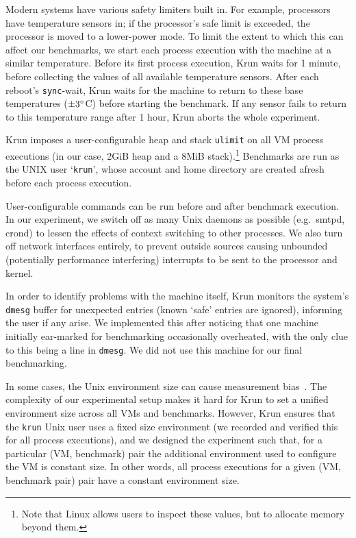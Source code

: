 \documentclass[preprint,numbers,10pt]{sigplanconf}
\newcommand{\krun}{Krun\xspace}
\begin{document}
Modern systems have various safety limiters built in. For example,
processors have temperature sensors in; if the processor's safe limit
is exceeded, the processor is moved to a lower-power mode. To limit the extent to which this can
affect our benchmarks, we start each process execution with the machine at a similar temperature.
Before its first process execution, \krun waits for 1 minute, before collecting
the values of all available temperature sensors. After each reboot's \texttt{sync}-wait, \krun waits
for the machine to return to these base temperatures ($\pm3\degree$C) before
starting the benchmark. If any sensor fails to return to this temperature range
after 1 hour, \krun aborts the whole experiment.

\krun imposes a
user-configurable heap and stack \texttt{ulimit} on all VM process executions
(in our case, 2GiB heap and a 8MiB stack).\footnote{Note that Linux allows users
to inspect these values, but to allocate memory beyond them.} Benchmarks are run
as the UNIX user `\texttt{krun}', whose account and home directory are created
afresh before each process execution.

User-configurable commands can be run before and after benchmark execution. In
our experiment, we switch off as many Unix daemons as possible (e.g.~smtpd,
crond) to lessen the effects of context switching to other processes. We also
turn off network interfaces entirely, to prevent outside sources causing unbounded
(potentially performance interfering) interrupts to be sent to the processor and kernel.

In order to identify problems with the machine itself, \krun monitors the
system's \texttt{dmesg} buffer for unexpected entries (known `safe' entries
are ignored), informing the user if any arise. We implemented this after
noticing that one machine initially ear-marked for benchmarking occasionally
overheated, with the only clue to this being a line in \texttt{dmesg}.
We did not use this machine for our final benchmarking.

In some cases, the Unix environment size can cause measurement
bias~\cite{mytkowicz09surprising}. The complexity of our experimental
setup makes it hard for \krun to set a unified environment size across all VMs and
benchmarks. However, \krun ensures that the \texttt{krun} Unix user uses
a fixed size environment (we recorded and verified this for all process
executions), and we designed the experiment such that, for a particular (VM,
benchmark) pair the additional environment used to configure the VM is constant
size. In other words, all process executions for a given (VM, benchmark pair)
pair have a constant environment size.
\end{document}
